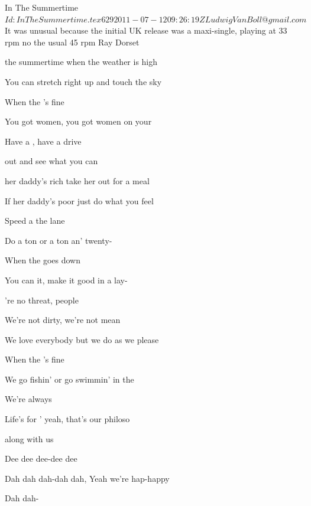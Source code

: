 \begin{SBSong}{In The Summertime}
  {$Id: InTheSummertime.tex 629 2011-07-12 09:26:19Z LudwigVanBoll@gmail.com $}
  {It was unusual because the initial UK release was a maxi-single, playing at 33 rpm no the usual 45 rpm}
  {Ray Dorset}
  \begin{SBVerse}
     the summertime when the weather is high
    
    You can stretch right up and touch the sky
    
    When the 's fine
    
    You got women, you got women on your 
    
    Have a , have a drive
    
     out and see what you can 
  \end{SBVerse}
  \begin{SBVerse}
     her daddy's rich take her out for a meal
    
    If her daddy's poor just do what you feel
    
    Speed a the lane
    
    Do a ton or a ton an' twenty-
    
    When the  goes down
    
    You can  it, make it good in a lay-
  \end{SBVerse}
  \begin{SBVerse}
    're no threat, people
    
    We're not dirty, we're not mean
    
    We love everybody but we do as we please
    
    When the 's fine
    
    We go fishin' or go swimmin' in the 
    
    We're always 
    
    Life's for ' yeah, that's our philoso
  \end{SBVerse}
  \CBPageBrk
  \begin{SBVerse}
     along with us
    
    Dee dee dee-dee dee
    
    Dah dah dah-dah dah, Yeah we're hap-happy
    
    Dah dah-
    

\end{SBVerse}
\end{SBSong}
